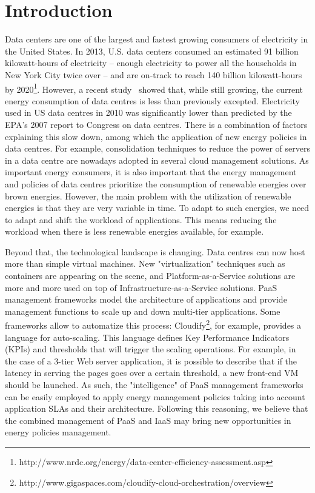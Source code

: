 \section{Introduction}
\label{sec: intro}
Data centers are one of the largest and fastest growing consumers of electricity in the United States. In 2013, U.S. data centers consumed an estimated 91 billion kilowatt-hours of electricity -- enough electricity to power all the households in New York City twice over -- and are on-track to reach 140 billion kilowatt-hours by 2020\footnote{http://www.nrdc.org/energy/data-center-efficiency-assessment.asp}.
However, a recent study~\cite{koomey2011} showed that, while still growing, the current energy consumption of data centres is less than previously excepted.
Electricity used in US data centres in 2010 was significantly lower than predicted by the EPA’s 2007 report to Congress on data centres.
There is a combination of factors explaining this slow down, among which the application of new energy policies in data centres.
For example, consolidation techniques to reduce the power of servers in a data centre are nowadays adopted in several cloud management solutions.
As important energy consumers, it is also important that the energy management and policies of data centres prioritize the consumption of renewable energies over brown energies.
However, the main problem with the utilization of renewable energies is that they are very variable in time.
To adapt to such energies, we need to adapt and shift the workload of applications.
This means reducing the workload when there is less renewable energies available, for example.

Beyond that, the technological landscape is changing.
Data centres can now host more than simple virtual machines.
New "virtualization" techniques such as containers are appearing on the scene, and Platform-as-a-Service solutions are more and more used on top of Infrastructure-as-a-Service solutions.
PaaS management frameworks model the architecture of applications and provide management functions to scale up and down multi-tier applications. 
Some frameworks allow to automatize this process: Cloudify\footnote{http://www.gigaspaces.com/cloudify-cloud-orchestration/overview}, for example, provides a language for auto-scaling.
This language defines Key Performance Indicators (KPIs) and thresholds that will trigger the scaling operations.
For example, in the case of a 3-tier Web server application, it is possible to describe that if the latency in serving the pages goes over a certain threshold, a new front-end VM should be launched.
As such, the "intelligence" of PaaS management frameworks can be easily employed to apply energy management policies taking into account application SLAs and their architecture.
Following this reasoning, we believe that the combined management of PaaS and IaaS may bring new opportunities in energy policies management.

